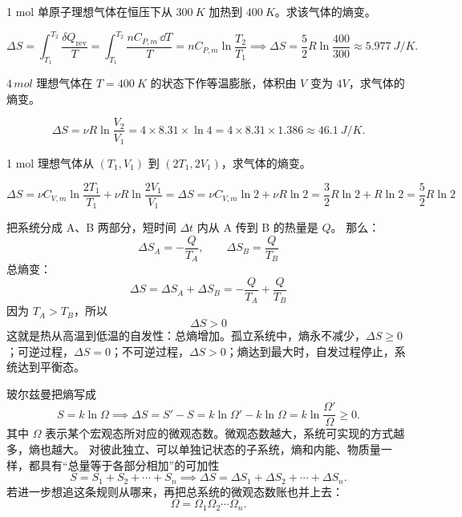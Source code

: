 \documentclass[lang=cn,11pt]{elegantbook}
\begin{document}
\begin{exercise}[等压升温的熵变]
1 mol 单原子理想气体在恒压下从 \(\SI{300}{K}\) 加热到 \(\SI{400}{K}\)。求该气体的熵变。
\end{exercise}

\begin{solution}
\[\Delta S=\int_{T_1}^{T_2}\frac{\delta Q_{\mathrm{rev}}}{T} =\int_{T_1}^{T_2}\frac{nC_{P,m}\,\dd T}{T} =nC_{P,m}\ln\frac{T_2}{T_1} \implies \Delta S=\frac{5}{2}R\ln\frac{400}{300}\approx \SI{5.977}{J/K}.\]
\end{solution}

\begin{exercise}
\(4\,\si{mol}\) 理想气体在 \(T=\SI{400}{K}\) 的状态下作等温膨胀，体积由 \(V\) 变为 \(4V\)，求气体的熵变。
\end{exercise}

\begin{solution}
 \[\Delta S =\nu R\ln\frac{V_2}{V_1}=4\times 8.31\times \ln4 =4\times 8.31\times 1.386 \approx \SI{46.1}{J/K}.\]
\end{solution}

\begin{exercise}
    1 mol 理想气体从 \((T_1,V_1)\) 到 \((2T_1,2V_1)\)，求气体的熵变。
\end{exercise}
\begin{solution}
\[
\Delta S=\nu C_{V,m}\ln\frac{2T_1}{T_1}+\nu R\ln\frac{2V_1}{V_1}=\Delta S=\nu C_{V,m}\ln 2+\nu R\ln 2=\frac32R\ln2+R\ln2=\frac52R\ln2
\]
\end{solution}

\begin{theorem}
把系统分成 A、B 两部分，短时间 \(\Delta t\) 内从 A 传到 B 的热量是 \(Q\)。
那么：\[
\Delta S_A=-\frac{Q}{T_A},\qquad
\Delta S_B=\frac{Q}{T_B}
\]
总熵变：\[
\Delta S=\Delta S_A+\Delta S_B
=-\frac{Q}{T_A}+\frac{Q}{T_B}
\]
因为 \(T_A>T_B\)，所以\[
\Delta S>0
\]
这就是热从高温到低温的自发性：总熵增加。孤立系统中，熵永不减少，\(\Delta S\ge 0\)；可逆过程，\(\Delta S=0\)；不可逆过程，\(\Delta S>0\)；熵达到最大时，自发过程停止，系统达到平衡态。
\end{theorem}

\begin{definition}
    玻尔兹曼把熵写成
 \[S=k\ln\Omega \implies \Delta S=S'-S=k\ln\Omega'-k\ln\Omega =k\ln\frac{\Omega'}{\Omega}\ge 0.\]
其中 \(\Omega\) 表示某个宏观态所对应的微观态数。微观态数越大，系统可实现的方式越多，熵也越大。
对彼此独立、可以单独记状态的子系统，熵和内能、物质量一样，都具有“总量等于各部分相加”的可加性
 \[S=S_1+S_2+\cdots+S_n \implies \Delta S=\Delta S_1+\Delta S_2+\cdots+\Delta S_n.\]
若进一步想追这条规则从哪来，再把总系统的微观态数账也并上去：
 \[\Omega=\Omega_1\Omega_2\cdots\Omega_n.\]
\end{definition}
\end{document}
